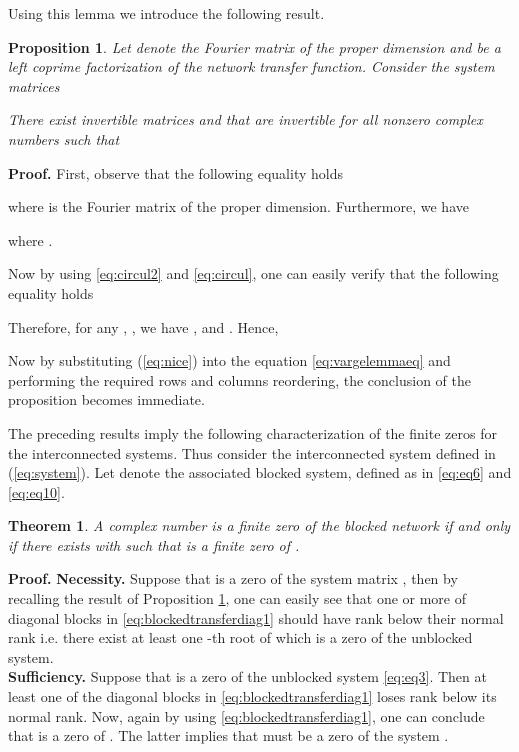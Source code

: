 \documentclass[twocolumn]{autart}    \usepackage{amsmath}
\newtheorem{theorem}{Theorem}
\newtheorem{proposition}{Proposition}
\begin{document}
Using this lemma we introduce the following result.

\begin{proposition}\label{PROPOSITION}
Let  denote the Fourier matrix of the  proper dimension and  be a left
coprime factorization of the network transfer function.
Consider the system matrices

There exist invertible  matrices
 and  that  are invertible for all nonzero complex numbers
  such that
{\footnotesize

}
\end{proposition}




\noindent \textbf{Proof.}
First, observe that the following equality holds

where  is the Fourier matrix of the proper dimension. Furthermore, we have



where .

Now  by using  \eqref{eq:circul2} and  \eqref{eq:circul}, one can easily verify that  the following equality holds



Therefore, for any , , we have ,  and . Hence,


Now by substituting (\ref{eq:nice}) into the equation \eqref{eq:vargelemmaeq} and performing the required rows and  columns reordering,  the conclusion of the proposition becomes immediate. 

\hfill 


The preceding results imply the following  characterization  of
the finite zeros for the interconnected systems.  Thus consider the
interconnected system   defined
in (\ref{eq:system}). Let
 denote the associated
blocked system, defined as in \eqref{eq:eq6} and \eqref{eq:eq10}.
\begin{theorem}
 A complex number  is a finite zero of the blocked
network
 if and only if there
exists  with  such that  is a finite zero of
.
\end{theorem}
 \noindent \textbf{Proof.}
  \textbf{Necessity.} Suppose that  is a zero of the system matrix , then by recalling  the result  of Proposition \ref{PROPOSITION}, one can easily  see  that one or  more of diagonal blocks in \eqref{eq:blockedtransferdiag1} should have rank below their  normal rank i.e. there exist at least one -th root of  which is a zero  of the unblocked system. \\
  \textbf{Sufficiency.}  Suppose that  is a zero of the unblocked system \eqref{eq:eq3}. Then at least one of the diagonal blocks in \eqref{eq:blockedtransferdiag1} loses rank below its normal rank. Now, again  by using   \eqref{eq:blockedtransferdiag1}, one can conclude that  is a zero of . The latter implies that  must be a zero of the system .
\end{document}
